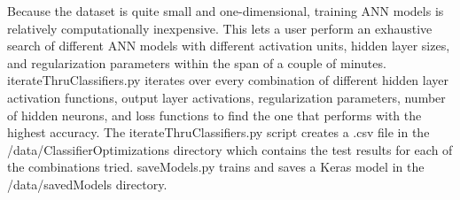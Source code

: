 Because the dataset is quite small and one-dimensional, training ANN models is relatively computationally inexpensive. This lets a user perform an exhaustive search of different ANN models with different activation units, hidden layer sizes, and regularization parameters within the span of a couple of minutes. iterateThruClassifiers.py iterates over every combination of different hidden layer activation functions, output layer activations, regularization parameters, number of hidden neurons, and loss functions to find the one that performs with the highest accuracy. The iterateThruClassifiers.py script creates a .csv file in the /data/ClassifierOptimizations directory which contains the test results for each of the combinations tried. 
saveModels.py trains and saves a Keras model in the /data/savedModels directory.
